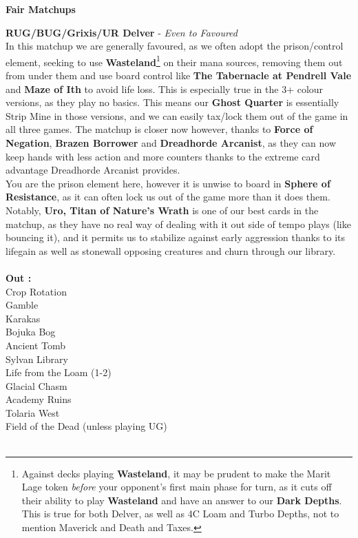 \documentclass{report}
\begin{document}
\begin{center}
\textbf{Fair Matchups\\}
\end{center}
\textbf{RUG/BUG/Grixis/UR Delver} - \emph{Even to Favoured}\\
In this matchup we are generally favoured, as we often adopt the prison/control element, seeking to use \textbf{Wasteland}\footnote{Against decks playing \textbf{Wasteland}, it may be prudent to make the Marit Lage token \emph{before} your opponent's first main phase for turn, as it cuts off their ability to play \textbf{Wasteland} and have an answer to our \textbf{Dark Depths}. This is true for both Delver, as well as 4C Loam and Turbo Depths, not to mention Maverick and Death and Taxes.} on their mana sources, removing them out from under them and use board control like \textbf{The Tabernacle at Pendrell Vale} and \textbf{Maze of Ith} to avoid life loss. This is especially true in the 3+ colour versions, as they play no basics. This means our \textbf{Ghost Quarter} is essentially Strip Mine in those versions, and we can easily tax/lock them out of the game in all three games. The matchup is closer now however, thanks to \textbf{Force of Negation}, \textbf{Brazen Borrower} and \textbf{Dreadhorde Arcanist}, as they can now keep hands with less action and more counters thanks to the extreme card advantage Dreadhorde Arcanist provides.\\You are the prison element here, however it is unwise to board in \textbf{Sphere of Resistance}, as it can often lock us out of the game more than it does them. Notably, \textbf{Uro, Titan of Nature's Wrath} is one of our best cards in the matchup, as they have no real way of dealing with it out side of tempo plays (like bouncing it), and it permits us to stabilize against early aggression thanks to its lifegain as well as stonewall opposing creatures and churn through our library.\\\\
\textbf{Out :}\\
Crop Rotation\\Gamble\\Karakas\\Bojuka Bog\\Ancient Tomb\\Sylvan Library\\Life from the Loam (1-2)\\Glacial Chasm\\Academy Ruins\\Tolaria West\\Field of the Dead (unless playing UG)\\\\
\end{document}
